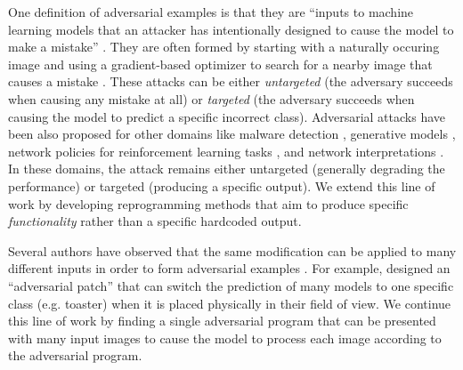 \documentclass{article}
\begin{document}
One definition of adversarial examples is that they are
``inputs to machine learning models that an attacker has intentionally designed to cause the model to make a mistake''
\citep{goodfellow2017}.
They are often formed by starting with a naturally occuring image
and using a gradient-based optimizer to search for a nearby
image that causes a mistake
\citep{Biggio13,szegedy2013intriguing,7958570}.
These attacks can be either {\em untargeted} (the adversary succeeds
when causing any mistake at all) or {\em targeted} (the adversary
succeeds when causing the model to predict a specific incorrect class).
Adversarial attacks have been also proposed for other domains like malware detection \citep{grosse17}, generative models \citep{kos2017adversarial}, network policies for reinforcement learning tasks \citep{huang2017adversarial}, and network interpretations \citep{ghorbani2017interpretation}. 
In these domains, the attack remains either untargeted (generally degrading the performance)
or targeted (producing a specific output).
We extend this line of work by developing reprogramming methods that aim to
produce specific {\em functionality} rather than a specific hardcoded output.

Several authors have observed that the same modification can be
applied to many different inputs in order to form adversarial
examples \citep{goodfellow2014explaining,moosavi2017universal}.
For example,  \citet{brown2017adversarial} designed an
``adversarial patch'' that can switch the prediction of many models
to one specific class (e.g. toaster) when it is placed physically
in their field of view.
We continue this line of work by finding a single adversarial
program that can be presented with many input images to cause
the model to process each image according to the adversarial
program.
\end{document}

